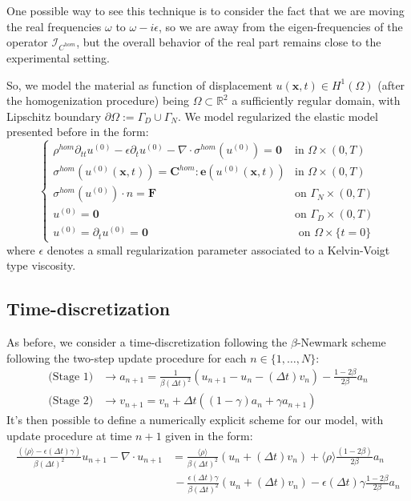 \begin{rem}
One possible way to see this technique is to consider the fact that we are moving the real frequencies $\omega$ to $\omega - i\epsilon$, so we are away from the eigen-frequencies of the operator $\mathcal{I}_{C^{hom}}$, but the overall behavior of the real part remains close to the experimental setting.
\end{rem}

So, we model the material as function of displacement $u(\mathbf{x},t) \in H^{1}(\Omega)$ (after the homogenization procedure) being $\Omega \subset \mathbb{R}^2$ a sufficiently regular domain, with Lipschitz boundary $\partial \Omega := \Gamma_D \cup \Gamma_N$. 
We model regularized the elastic model presented before in the form:
\begin{equation*}
    \left \{
    \begin{array}{cc}
        \rho^{hom} \partial_{tt} u^{(0)} - \epsilon \partial_{t} u^{(0)} - \nabla \cdot \sigma^{hom}(u^{(0)}) = \mathbf{0} & \text{in } \Omega \times (0,T) \\
        \sigma^{hom}(u^{(0)}(\mathbf{x},t)) =  \mathbf{C}^{hom}:\mathbf{e}(u^{(0)}(\mathbf{x},t))  & \text{in }\Omega \times (0,T)\\ 
        \sigma^{hom}(u^{(0)})\cdot n = \mathbf{F} & \text{on }\Gamma_N\times (0,T) \\
        u^{(0)} = \mathbf{0} & \text{on }\Gamma_D \times (0,T) \\
        u^{(0)} = \partial_t u^{(0)} = \mathbf{0}& \text{ on } \Omega \times \{t=0\}
    \end{array}
    \right .
\end{equation*}
where $\epsilon$ denotes a small regularization parameter associated to a Kelvin-Voigt type viscosity. 
\subsection{Time-discretization}
As before, we consider a time-discretization following the $\beta$-Newmark scheme following the two-step update procedure for each $n \in \{1,\dots, N\}$:
\begin{align*}
    \text{(Stage 1)} &\longrightarrow a_{n+1} = \frac{1}{\beta (\Delta t)^2} (u_{n+1}-u_{n}-(\Delta t)v_n) - \frac{1-2\beta}{2\beta}a_n\\
    \text{(Stage 2)}& \longrightarrow v_{n+1} = v_n + \Delta t((1-\gamma)a_n + \gamma a_{n+1})
\end{align*}
It's then possible to define a numerically explicit scheme for our model, with update procedure at time $n+1$ given in the form:
\begin{align*}
    \frac{(\langle \rho \rangle- \epsilon (\Delta t) \gamma)}{\beta (\Delta t)^2} u_{n+1} - \nabla \cdot u_{n+1} &= \frac{\langle \rho \rangle}{\beta (\Delta t)^2} (u_n + (\Delta t)v_n) + \langle \rho \rangle\frac{ (1-2\beta)}{2\beta}a_n \\
    & \, - \frac{\epsilon (\Delta t)\gamma}{\beta (\Delta t)^2}(u_n + (\Delta t)v_n) - \epsilon (\Delta t)\gamma\frac{1-2\beta}{2 \beta} a_n
\end{align*}

